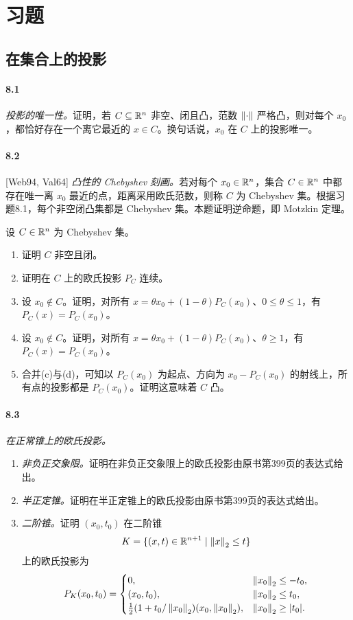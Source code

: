 \section*{习题}
\subsection*{在集合上的投影}
\paragraph{8.1}\textit{投影的唯一性。}证明，若 $C\subseteq\mathbb R^n$ 非空、闭且凸，范数 $\left\lVert \cdot\right\rVert$ 严格凸，则对每个 $x_0$，都恰好存在一个离它最近的 $x\in C$。换句话说，$x_0$ 在 $C$ 上的投影唯一。
\paragraph{8.2}[Web94, Val64] \textit{凸性的 Chebyshev 刻画。}若对每个 $x_0\in\mathbb R^n$，集合 $C\in\mathbb R^n$ 中都存在唯一离 $x_0$ 最近的点，距离采用欧氏范数，则称 $C$ 为 Chebyshev 集。根据习题8.1，每个非空闭凸集都是 Chebyshev 集。本题证明逆命题，即 Motzkin 定理。

设 $C\in\mathbb R^n$ 为 Chebyshev 集。
\begin{enumerate}[label=(\alph*)]
\item 证明 $C$ 非空且闭。
\item 证明在 $C$ 上的欧氏投影 $P_C$ 连续。
\item 设 $x_0\notin C$。证明，对所有 $x=\theta x_0+(1-\theta)P_C(x_0)$、$0\leq\theta\leq1$，有 $P_C(x)=P_C(x_0)$。
\item 设 $x_0\notin C$。证明，对所有 $x=\theta x_0+(1-\theta)P_C(x_0)$、$\theta\geq1$，有 $P_C(x)=P_C(x_0)$。
\item 合并(c)与(d)，可知以 $P_C(x_0)$ 为起点、方向为 $x_0-P_C(x_0)$ 的射线上，所有点的投影都是 $P_C(x_0)$。证明这意味着 $C$ 凸。
\end{enumerate}
\paragraph{8.3}\textit{在正常锥上的欧氏投影。}
\begin{enumerate}[label=(\alph*)]
\item \textit{非负正交象限。}证明在非负正交象限上的欧氏投影由原书第399页的表达式给出。
\item \textit{半正定锥。}证明在半正定锥上的欧氏投影由原书第399页的表达式给出。
\item \textit{二阶锥。}证明 $(x_0,t_0)$ 在二阶锥
\[K=\{(x,t)\in\mathbb R^{n+1}\mid\left\lVert x\right\rVert_2\leq t\}\]
上的欧氏投影为
\[P_K(x_0,t_0)=\begin{cases}
0,&\left\lVert x_0\right\rVert_2\leq-t_0,\\
(x_0,t_0),&\left\lVert x_0\right\rVert_2\leq t_0,\\
\tfrac12(1+t_0/\left\lVert x_0\right\rVert_2)(x_0,\left\lVert x_0\right\rVert_2),&\left\lVert x_0\right\rVert_2\geq|t_0|.
\end{cases}\]
\end{enumerate}
